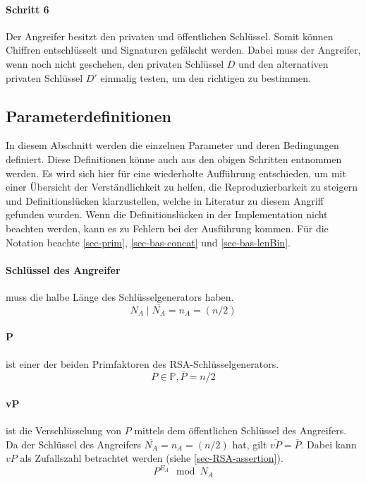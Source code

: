             \paragraph{Schritt 6} \label{sec-Schritt-Ang 6} Der Angreifer besitzt den privaten und öffentlichen Schlüssel. Somit können Chiffren entschlüsselt und Signaturen gefälscht werden. Dabei muss der Angreifer, wenn noch nicht geschehen, den privaten Schlüssel $D$ und den alternativen privaten Schlüssel $D'$ einmalig testen, um den richtigen zu bestimmen.
        
        \subsection{Parameterdefinitionen} \label{Parameterdefinitionen}
            In diesem Abschnitt werden die einzelnen Parameter und deren Bedingungen definiert. Diese Definitionen könne auch aus den obigen Schritten entnommen werden. Es wird sich hier für eine wiederholte Aufführung entschieden, um mit einer Übersicht der Verständlichkeit zu helfen, die Reproduzierbarkeit zu steigern und Definitionslücken klarzustellen, welche in Literatur zu diesem Angriff gefunden wurden. Wenn die Definitionslücken in der Implementation nicht beachten werden, kann es zu Fehlern bei der Ausführung kommen. Für die Notation beachte \ref{sec-prim}, \ref{sec-bas-concat} und \ref{sec-bas-lenBin}.

            \paragraph{Schlüssel des Angreifer} muss die halbe Länge des Schlüsselgenerators haben.
                \begin{equation}
                    N_{A} \mid \overline{N_{A}} = n_{A} = (n/2)
                \end{equation}

            \paragraph{P} ist einer der beiden Primfaktoren des \ac{RSA}-Schlüsselgenerators. 
                \begin{equation}
                    P \in \mathbb{P}, \overline{P} = n/2
                \end{equation}
            
            \paragraph{vP} ist die Verschlüsselung von $P$ mittels dem öffentlichen Schlüssel des Angreifers. Da der Schlüssel des Angreifers $\overline{N_{A}} = n_{A} = (n/2)$ hat, gilt $\overline{vP} = \overline{P}$. Dabei kann $vP$ als Zufallszahl betrachtet werden (siehe \ref{sec-RSA-assertion}). 
                \begin{equation}
                    P^{E_{A}} \mod N_{A}
                \end{equation}                
            
